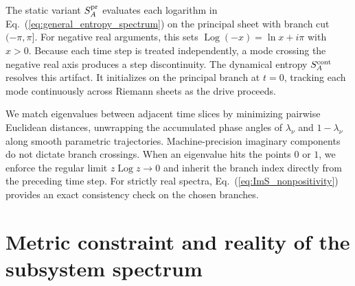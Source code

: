 \documentclass[aps,prb,reprint,superscriptaddress,amsmath,amssymb,floatfix]{revtex4-2}
\begin{document}
The static variant $S_A^{\rm pr}$ evaluates each logarithm in Eq.~(\ref{eq:general_entropy_spectrum}) on the principal sheet with branch cut $(-\pi,\pi]$. For negative real arguments, this sets $\operatorname{Log}(-x)=\ln x+i\pi$ with $x>0$. Because each time step is treated independently, a mode crossing the negative real axis produces a step discontinuity. The dynamical entropy $S_A^{\rm cont}$ resolves this artifact. It initializes on the principal branch at $t=0$, tracking each mode continuously across Riemann sheets as the drive proceeds.

We match eigenvalues between adjacent time slices by minimizing pairwise Euclidean distances, unwrapping the accumulated phase angles of $\lambda_\nu$ and $1-\lambda_\nu$ along smooth parametric trajectories. Machine-precision imaginary components do not dictate branch crossings. When an eigenvalue hits the points $0$ or $1$, we enforce the regular limit $z\operatorname{Log}z\to0$ and inherit the branch index directly from the preceding time step. For strictly real spectra, Eq.~(\ref{eq:ImS_nonpositivity}) provides an exact consistency check on the chosen branches.


\section{Metric constraint and reality of the subsystem spectrum}
\label{app:spectral_reality}
\end{document}
